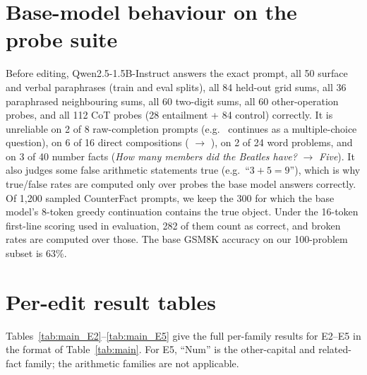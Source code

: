 \section{Base-model behaviour on the probe suite}
\label{app:base}
Before editing, Qwen2.5-1.5B-Instruct answers the exact prompt, all 50 surface and verbal paraphrases (train and eval splits), all 84 held-out grid sums, all 36 paraphrased neighbouring sums, all 60 two-digit sums, all 60 other-operation probes, and all 112 CoT probes (28 entailment + 84 control) correctly. It is unreliable on 2 of 8 raw-completion prompts (e.g.\  continues as a multiple-choice question), on 6 of 16 direct compositions ( $\to$ ), on 2 of 24 word problems, and on 3 of 40 number facts (\emph{How many members did the Beatles have?} $\to$ \emph{Five}). It also judges some false arithmetic statements true (e.g.\ ``$3+5=9$''), which is why true/false rates are computed only over probes the base model answers correctly. Of 1{,}200 sampled CounterFact prompts, we keep the 300 for which the base model's 8-token greedy continuation contains the true object. Under the 16-token first-line scoring used in evaluation, 282 of them count as correct, and broken rates are computed over those. The base GSM8K accuracy on our 100-problem subset is 63\%.

\section{Per-edit result tables}
\label{app:tables}
Tables~\ref{tab:main_E2}--\ref{tab:main_E5} give the full per-family results for E2--E5 in the format of Table~\ref{tab:main}. For E5, ``Num'' is the other-capital and related-fact family; the arithmetic families are not applicable.

\begin{table}[h]
\centering
\caption{E2 ($2+2$: $4\to7$).}\label{tab:main_E2}
\resizebox{\textwidth}{!}{}
\end{table}
\begin{table}[h]
\centering
\caption{E3 ($3+5$: $8\to9$).}\label{tab:main_E3}
\resizebox{\textwidth}{!}{}
\end{table}
\begin{table}[h]
\centering
\caption{E4 ($6+7$: $13\to14$).}\label{tab:main_E4}
\resizebox{\textwidth}{!}{}
\end{table}
\begin{table}[h]
\centering
\caption{E5 (capital of France: Paris$\to$Rome). ``Comp'' = entailment questions; ``Num'' = other capitals (chat and raw) and related facts.}\label{tab:main_E5}
\resizebox{\textwidth}{!}{}
\end{table}

